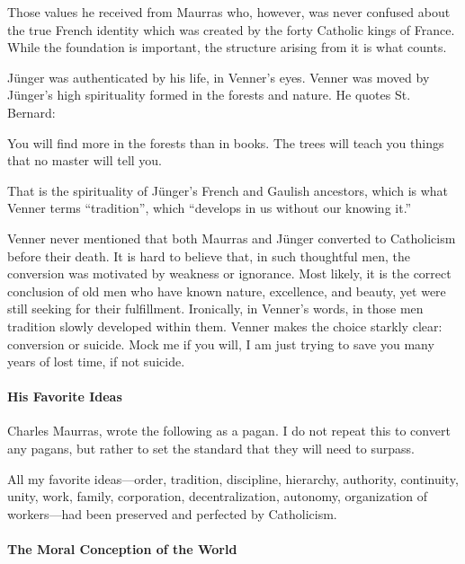 Those values he received from Maurras who, however, was never confused about the true French identity which was created by the forty Catholic kings of France. While the foundation is important, the structure arising from it is what counts.

Jünger was authenticated by his life, in Venner's eyes. Venner was moved by Jünger's high spirituality formed in the forests and nature. He quotes St. Bernard:

\begin{quotex}
You will find more in the forests than in books. The trees will teach you things that no master will tell you.
\end{quotex}


That is the spirituality of Jünger's French and Gaulish ancestors, which is what Venner terms ``tradition'', which ``develops in us without our knowing it.''

Venner never mentioned that both Maurras and Jünger converted to Catholicism before their death. It is hard to believe that, in such thoughtful men, the conversion was motivated by weakness or ignorance. Most likely, it is the correct conclusion of old men who have known nature, excellence, and beauty, yet were still seeking for their fulfillment. Ironically, in Venner's words, in those men tradition slowly developed within them. Venner makes the choice starkly clear: conversion or suicide. Mock me if you will, I am just trying to save you many years of lost time, if not suicide.

\paragraph{His Favorite Ideas}


Charles Maurras, wrote the following as a pagan. I do not repeat this to convert any pagans, but rather to set the standard that they will need to surpass.

\begin{quotex}
All my favorite ideas---order, tradition, discipline, hierarchy, authority, continuity, unity, work, family, corporation, decentralization, autonomy, organization of workers---had been preserved and perfected by Catholicism.
\end{quotex}


\paragraph{The Moral Conception of the World}


